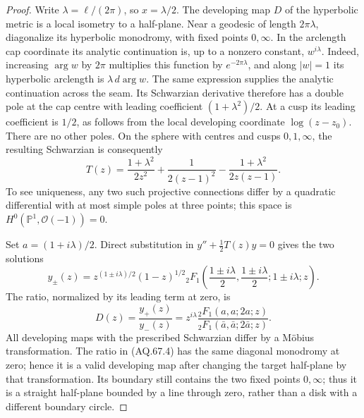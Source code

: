 \documentclass[11pt,a4paper]{article}
\theoremstyle{definition}\newtheorem{definition}[theorem]{Definition}
\theoremstyle{remark}\newtheorem{remark}[theorem]{Remark}
\begin{document}
\begin{proof}
Write $\lambda=\ell/(2\pi)$, so $x=\lambda/2$.
The developing map $D$ of the hyperbolic metric is a local isometry
to a half-plane. Near a geodesic of length $2\pi\lambda$, diagonalize
its hyperbolic monodromy, with fixed points $0,\infty$.
In the arclength cap coordinate its analytic continuation is, up
to a nonzero constant, $w^{i\lambda}$. Indeed, increasing
$\arg w$ by $2\pi$ multiplies this function by $e^{-2\pi\lambda}$,
and along $|w|=1$ its hyperbolic arclength is
$\lambda\,d\arg w$. The same expression supplies the analytic
continuation across the seam. Its Schwarzian derivative therefore
has a double pole at the cap centre with leading coefficient
$(1+\lambda^2)/2$. At a cusp its leading coefficient is $1/2$,
as follows from the local developing coordinate $\log(z-z_0)$.
There are no other poles. On the sphere with centres and cusps
$0,1,\infty$, the resulting Schwarzian is consequently
\[
 T(z)=\frac{1+\lambda^2}{2z^2}
       +\frac1{2(z-1)^2}
       -\frac{1+\lambda^2}{2z(z-1)}.                           \tag{AQ.67.3}
\]
To see uniqueness, any two such projective connections differ by
a quadratic differential with at most simple poles at three points;
this space is $H^0(\mathbb P^1,\mathcal O(-1))=0$.

Set $a=(1+i\lambda)/2$. Direct substitution in
$y''+\tfrac12T(z)y=0$ gives the two solutions
\[
 y_\pm(z)=z^{(1\pm i\lambda)/2}(1-z)^{1/2}
     {}_2F_1\!\left(\frac{1\pm i\lambda}{2},
                    \frac{1\pm i\lambda}{2};
                    1\pm i\lambda;z\right).
\]
The ratio, normalized by its leading term at zero, is
\[
 D(z)=\frac{y_+(z)}{y_-(z)}
     =z^{i\lambda}
       \frac{{}_2F_1(a,a;2a;z)}
            {{}_2F_1(\bar a,\bar a;2\bar a;z)}.                \tag{AQ.67.4}
\]
All developing maps with the prescribed Schwarzian differ by a
M\"obius transformation. The ratio in (AQ.67.4) has the same
diagonal monodromy at zero; hence it is a valid developing map
after changing the target half-plane by that transformation.
Its boundary still contains the two fixed points $0,\infty$;
thus it is a straight half-plane bounded by a line through zero,
rather than a disk with a different boundary circle.


\end{proof}
\end{document}

